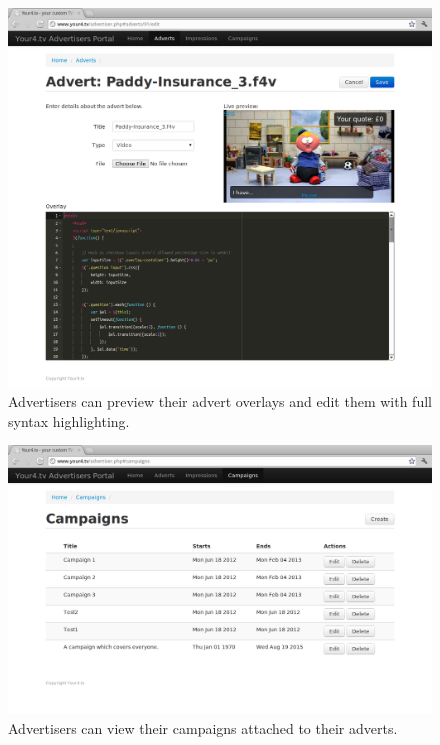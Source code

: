 \begin{figure}[th]
	\centering
	\includegraphics[width=\textwidth,height=0.5\textheight,keepaspectratio]{images/screenshots/advertiser-advert-edit.png}
	\caption{Advertisers can preview their advert overlays and edit them with full syntax highlighting.}
	\label{fig:advertiser-advert-edit}
\end{figure}
\begin{figure}[th]
	\centering
	\includegraphics[width=\textwidth,height=0.5\textheight,keepaspectratio]{images/screenshots/advertiser-campaigns.png}
	\caption{Advertisers can view their campaigns attached to their adverts.}
	\label{fig:advertiser-campaigns}
\end{figure}
